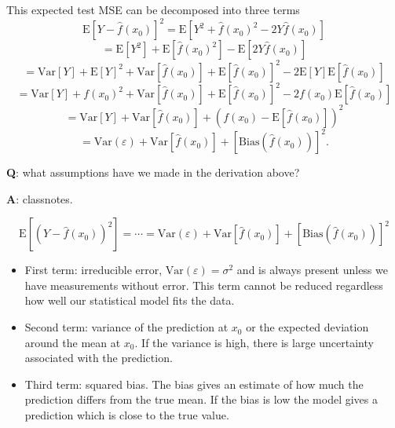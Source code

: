\documentclass[ignorenonframetext,]{beamer}
\providecommand{\tightlist}{%
  \setlength{\itemsep}{0pt}\setlength{\parskip}{0pt}}
\begin{document}
\begin{frame}

This expected test MSE can be decomposed into three terms
\[\text{E}[Y - \hat{f}(x_0)]^2 = \text{E}[Y^2 + \hat{f}(x_0)^2 - 2 Y \hat{f}(x_0)] \]
\[= \text{E}[Y^2] + \text{E}[\hat{f}(x_0)^2] - \text{E}[2Y \hat{f}(x_0)]\]
\[= \text{Var}[Y] + \text{E}[Y]^2 + \text{Var}[\hat{f}(x_0)] + \text{E}[\hat{f}(x_0)]^2 - 2 \text{E}[Y]\text{E}[\hat{f}(x_0)] \]
\[= \text{Var}[Y]+f(x_0)^2+\text{Var}[\hat{f}(x_0)]+\text{E}[\hat{f}(x_0)]^2-2f(x_0)\text{E}[\hat{f}(x_0)]\]
\[= \text{Var}[Y]+\text{Var}[\hat{f}(x_0)]+(f(x_0)-\text{E}[\hat{f}(x_0)])^2\]
\[= \text{Var}(\varepsilon) +  \text{Var}[\hat{f}(x_0)]+[\text{Bias}(\hat{f}(x_0))]^2.\]

\textbf{Q}: what assumptions have we made in the derivation above?

\textbf{A}: classnotes.

\end{frame}

\begin{frame}

\[\text{E}[(Y - \hat{f}(x_0))^2]=\cdots=\text{Var}(\varepsilon) +  \text{Var}[\hat{f}(x_0)]+[\text{Bias}(\hat{f}(x_0))]^2\]

\begin{itemize}
\tightlist
\item
  First term: irreducible error, \(\text{Var}(\varepsilon)=\sigma^2\)
  and is always present unless we have measurements without error. This
  term cannot be reduced regardless how well our statistical model fits
  the data.
\item
  Second term: variance of the prediction at \(x_0\) or the expected
  deviation around the mean at \(x_0\). If the variance is high, there
  is large uncertainty associated with the prediction.
\item
  Third term: squared bias. The bias gives an estimate of how much the
  prediction differs from the true mean. If the bias is low the model
  gives a prediction which is close to the true value.
\end{itemize}

\end{frame}
\end{document}
